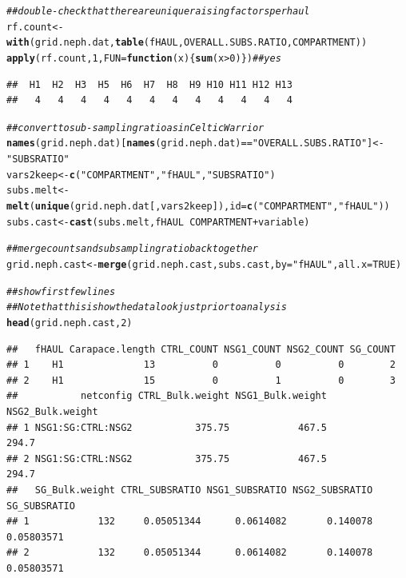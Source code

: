 \documentclass[12pt]{article}\usepackage[]{graphicx}\usepackage[]{color}
\makeatletter
\newcommand{\hlnum}[1]{\textcolor[rgb]{0.686,0.059,0.569}{#1}}%
\newcommand{\hlstr}[1]{\textcolor[rgb]{0.192,0.494,0.8}{#1}}%
\newcommand{\hlcom}[1]{\textcolor[rgb]{0.678,0.584,0.686}{\textit{#1}}}%
\newcommand{\hlopt}[1]{\textcolor[rgb]{0,0,0}{#1}}%
\newcommand{\hlstd}[1]{\textcolor[rgb]{0.345,0.345,0.345}{#1}}%
\newcommand{\hlkwa}[1]{\textcolor[rgb]{0.161,0.373,0.58}{\textbf{#1}}}%
\newcommand{\hlkwb}[1]{\textcolor[rgb]{0.69,0.353,0.396}{#1}}%
\newcommand{\hlkwc}[1]{\textcolor[rgb]{0.333,0.667,0.333}{#1}}%
\newcommand{\hlkwd}[1]{\textcolor[rgb]{0.737,0.353,0.396}{\textbf{#1}}}%
\newenvironment{kframe}{%
 \def\at@end@of@kframe{}%
 \ifinner\ifhmode%
  \def\at@end@of@kframe{\end{minipage}}%
  \begin{minipage}{\columnwidth}%
 \fi\fi%
 \def\FrameCommand##1{\hskip\@totalleftmargin \hskip-\fboxsep
 \colorbox{shadecolor}{##1}\hskip-\fboxsep
     \hskip-\linewidth \hskip-\@totalleftmargin \hskip\columnwidth}%
 \MakeFramed {\advance\hsize-\width
   \@totalleftmargin\z@ \linewidth\hsize
   \@setminipage}}%
 {\par\unskip\endMakeFramed%
 \at@end@of@kframe}
\newenvironment{knitrout}{}{} %
\makeatother
\begin{document}
\begin{knitrout}
\begin{kframe}
\begin{alltt}
\hlcom{## double-check that there are unique raising factors per haul}
\hlstd{rf.count} \hlkwb{<-} \hlkwd{with}\hlstd{(grid.neph.dat,} \hlkwd{table}\hlstd{(fHAUL, OVERALL.SUBS.RATIO, COMPARTMENT))}
\hlkwd{apply}\hlstd{(rf.count,} \hlnum{1}\hlstd{,} \hlkwc{FUN} \hlstd{=} \hlkwa{function}\hlstd{(}\hlkwc{x}\hlstd{)\{}\hlkwd{sum}\hlstd{(x}\hlopt{>}\hlnum{0}\hlstd{)\})} \hlcom{## yes}
\end{alltt}
\begin{verbatim}
##  H1  H2  H3  H5  H6  H7  H8  H9 H10 H11 H12 H13 
##   4   4   4   4   4   4   4   4   4   4   4   4
\end{verbatim}
\begin{alltt}
\hlcom{## convert to sub-sampling ratio as in Celtic Warrior}
\hlkwd{names}\hlstd{(grid.neph.dat)[}\hlkwd{names}\hlstd{(grid.neph.dat)} \hlopt{==} \hlstr{"OVERALL.SUBS.RATIO"}\hlstd{]} \hlkwb{<-} \hlstr{"SUBSRATIO"}
\hlstd{vars2keep} \hlkwb{<-} \hlkwd{c}\hlstd{(}\hlstr{"COMPARTMENT"}\hlstd{,} \hlstr{"fHAUL"}\hlstd{,} \hlstr{"SUBSRATIO"}\hlstd{)}
\hlstd{subs.melt} \hlkwb{<-} \hlkwd{melt}\hlstd{(}\hlkwd{unique}\hlstd{(grid.neph.dat[, vars2keep]),} \hlkwc{id} \hlstd{=} \hlkwd{c}\hlstd{(}\hlstr{"COMPARTMENT"}\hlstd{,} \hlstr{"fHAUL"}\hlstd{))}
\hlstd{subs.cast} \hlkwb{<-} \hlkwd{cast}\hlstd{(subs.melt, fHAUL}  \hlopt{~} \hlstd{COMPARTMENT} \hlopt{+} \hlstd{variable)}

\hlcom{## merge counts and subsampling ratio back together }
\hlstd{grid.neph.cast} \hlkwb{<-} \hlkwd{merge}\hlstd{(grid.neph.cast, subs.cast,} \hlkwc{by} \hlstd{=} \hlstr{"fHAUL"}\hlstd{,} \hlkwc{all.x} \hlstd{=} \hlnum{TRUE}\hlstd{)}

\hlcom{## show first few lines}
\hlcom{## Note that this is how the data look just prior to analysis}
\hlkwd{head}\hlstd{(grid.neph.cast,} \hlnum{2}\hlstd{)}
\end{alltt}
\begin{verbatim}
##   fHAUL Carapace.length CTRL_COUNT NSG1_COUNT NSG2_COUNT SG_COUNT
## 1    H1              13          0          0          0        2
## 2    H1              15          0          1          0        3
##           netconfig CTRL_Bulk.weight NSG1_Bulk.weight NSG2_Bulk.weight
## 1 NSG1:SG:CTRL:NSG2           375.75            467.5            294.7
## 2 NSG1:SG:CTRL:NSG2           375.75            467.5            294.7
##   SG_Bulk.weight CTRL_SUBSRATIO NSG1_SUBSRATIO NSG2_SUBSRATIO SG_SUBSRATIO
## 1            132     0.05051344      0.0614082       0.140078   0.05803571
## 2            132     0.05051344      0.0614082       0.140078   0.05803571
\end{verbatim}
\end{kframe}
\end{knitrout}
\end{document}
